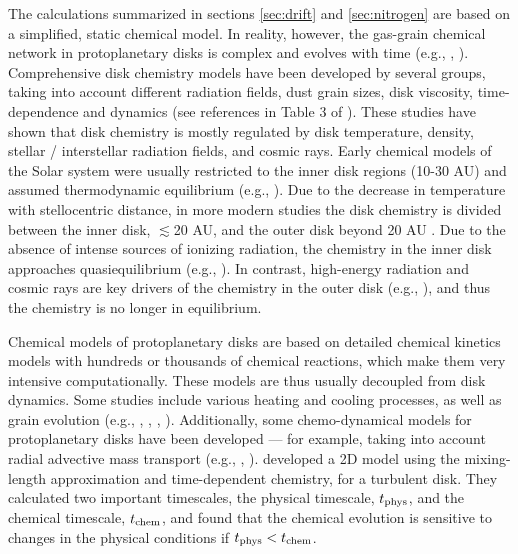 \documentclass[manuscript]{aastex}
\begin{document}
The calculations summarized in sections \ref{sec:drift} and \ref{sec:nitrogen} are based on a simplified, static chemical model. In reality, however, the gas-grain chemical network in protoplanetary disks is complex and evolves with time (e.g., \citealt{bergin09}, \citealt{fogel11}). Comprehensive disk chemistry models have been developed by several groups, taking into account different radiation fields, dust grain sizes, disk viscosity, time-dependence and dynamics (see references in Table 3 of \citealt{henning13}). These studies have shown that disk chemistry is mostly regulated by disk temperature, density, stellar / interstellar radiation fields, and cosmic rays. Early chemical models of the Solar system were usually restricted to the inner disk regions (10-30 AU) and assumed thermodynamic equilibrium (e.g., \citealt{cameron95}). Due to the decrease in temperature with stellocentric distance, in more modern studies the disk chemistry is divided between the inner disk, $\lesssim$20 AU, and the outer disk beyond 20 AU \citep{henning13}. Due to the absence of intense sources of ionizing radiation, the chemistry in the inner disk approaches quasiequilibrium (e.g., \citealt{ilgner04}). In contrast, high-energy radiation and cosmic rays are key drivers of the chemistry in the outer disk (e.g., \citealt{vandishoeck}), and thus the chemistry is no longer in equilibrium. 

Chemical models of protoplanetary disks are based on detailed chemical kinetics models with hundreds or thousands of chemical reactions, which make them very intensive computationally. These models are thus usually decoupled from disk dynamics. Some studies include various heating and cooling processes, as well as grain evolution (e.g., \citealt{aikawa06}, \citealt{fogel11}, \citealt{vasyunin11}, \citealt{akimkin13}). Additionally, some chemo-dynamical models for protoplanetary disks have been developed --- for example, taking into account radial advective mass transport (e.g., \citealt{aikawa99}, \citealt{woods09}). \citet{semenov11} developed a 2D model using the mixing-length approximation and time-dependent chemistry, for a turbulent disk. They calculated two important timescales, the physical timescale, $t_{\rm phys}$, and the chemical timescale, $t_{\rm chem}$, and found that the chemical evolution is sensitive to changes in the physical conditions if $t_{\rm phys}<t_{\rm chem}$. 
\end{document}

